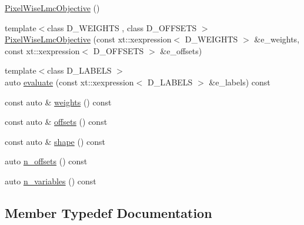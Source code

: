 \begin{DoxyCompactItemize}
\item 
\hyperlink{classnifty_1_1graph_1_1opt_1_1lifted__multicut_1_1PixelWiseLmcObjective_a9ca29aebe51f087b87d9353b72e5b4f3}{Pixel\+Wise\+Lmc\+Objective} ()
\item 
{\footnotesize template$<$class D\+\_\+\+W\+E\+I\+G\+H\+TS , class D\+\_\+\+O\+F\+F\+S\+E\+TS $>$ }\\\hyperlink{classnifty_1_1graph_1_1opt_1_1lifted__multicut_1_1PixelWiseLmcObjective_a289a981e481ffd785ff9e902a1c6b81c}{Pixel\+Wise\+Lmc\+Objective} (const xt\+::xexpression$<$ D\+\_\+\+W\+E\+I\+G\+H\+TS $>$ \&e\+\_\+weights, const xt\+::xexpression$<$ D\+\_\+\+O\+F\+F\+S\+E\+TS $>$ \&e\+\_\+offsets)
\item 
{\footnotesize template$<$class D\+\_\+\+L\+A\+B\+E\+LS $>$ }\\auto \hyperlink{classnifty_1_1graph_1_1opt_1_1lifted__multicut_1_1PixelWiseLmcObjective_a747f137d69865cae987d39e3d1f7d8da}{evaluate} (const xt\+::xexpression$<$ D\+\_\+\+L\+A\+B\+E\+LS $>$ \&e\+\_\+labels) const
\item 
const auto \& \hyperlink{classnifty_1_1graph_1_1opt_1_1lifted__multicut_1_1PixelWiseLmcObjective_ad84609a85d2203e52d4eb16c83a3930f}{weights} () const
\item 
const auto \& \hyperlink{classnifty_1_1graph_1_1opt_1_1lifted__multicut_1_1PixelWiseLmcObjective_a1c9506b64a31e69ffe33ce76e94a3399}{offsets} () const
\item 
const auto \& \hyperlink{classnifty_1_1graph_1_1opt_1_1lifted__multicut_1_1PixelWiseLmcObjective_a7d7e653cc95b721c529a397652e36b9a}{shape} () const
\item 
auto \hyperlink{classnifty_1_1graph_1_1opt_1_1lifted__multicut_1_1PixelWiseLmcObjective_a8362f64cc0d7898d9fb9d7350cf85ce7}{n\+\_\+offsets} () const
\item 
auto \hyperlink{classnifty_1_1graph_1_1opt_1_1lifted__multicut_1_1PixelWiseLmcObjective_abb3ae8311e13fc58cf745ba0e232a2e9}{n\+\_\+variables} () const
\end{DoxyCompactItemize}


\subsection{Member Typedef Documentation}
\mbox{\label{classnifty_1_1graph_1_1opt_1_1lifted__multicut_1_1PixelWiseLmcObjective_afe887edc57b2dcaaf16c8d37a7ef75f5}} 
